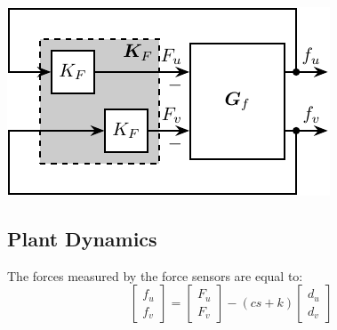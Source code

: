 \documentclass{ISMA_USD2020}
\begin{document}
\begin{minipage}[t]{0.40\linewidth}
\begin{center}
\includegraphics[scale=1]{figs/control_diagram_iff.pdf}
\end{center}
\end{minipage}

\subsection{Plant Dynamics}
\label{sec:org8c9a16a}
The forces measured by the force sensors are equal to:
\begin{equation}
\label{eq:measured_force}
  \begin{bmatrix} f_{u} \\ f_{v} \end{bmatrix} =
  \begin{bmatrix} F_u \\ F_v \end{bmatrix} - (c s + k)
  \begin{bmatrix} d_u \\ d_v \end{bmatrix}
\end{equation}
\end{document}
